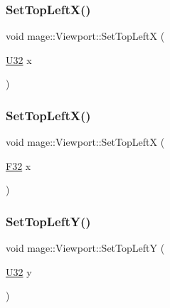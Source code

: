 \hypertarget{classmage_1_1_viewport_ade1d4a8ed0ecb51f7e70551f20cb4bea}{}\label{classmage_1_1_viewport_ade1d4a8ed0ecb51f7e70551f20cb4bea} 
\subsubsection{\texorpdfstring{Set\+Top\+Left\+X()}{SetTopLeftX()}\hspace{0.1cm}{\footnotesize\ttfamily [1/2]}}
{\footnotesize\ttfamily void mage\+::\+Viewport\+::\+Set\+Top\+LeftX (\begin{DoxyParamCaption}\item[{\hyperlink{namespacemage_a41c104c036fba3756a74e19f793eeaa1}{U32}}]{x }\end{DoxyParamCaption})\hspace{0.3cm}{\ttfamily [noexcept]}}

\hypertarget{classmage_1_1_viewport_a4626d58f3b62ed61318a090bf9522c9a}{}\label{classmage_1_1_viewport_a4626d58f3b62ed61318a090bf9522c9a} 
\subsubsection{\texorpdfstring{Set\+Top\+Left\+X()}{SetTopLeftX()}\hspace{0.1cm}{\footnotesize\ttfamily [2/2]}}
{\footnotesize\ttfamily void mage\+::\+Viewport\+::\+Set\+Top\+LeftX (\begin{DoxyParamCaption}\item[{\hyperlink{namespacemage_aa97e833b45f06d60a0a9c4fc22ae02c0}{F32}}]{x }\end{DoxyParamCaption})\hspace{0.3cm}{\ttfamily [noexcept]}}

\hypertarget{classmage_1_1_viewport_afb82849d9082a60372add783d89263e4}{}\label{classmage_1_1_viewport_afb82849d9082a60372add783d89263e4} 
\subsubsection{\texorpdfstring{Set\+Top\+Left\+Y()}{SetTopLeftY()}\hspace{0.1cm}{\footnotesize\ttfamily [1/2]}}
{\footnotesize\ttfamily void mage\+::\+Viewport\+::\+Set\+Top\+LeftY (\begin{DoxyParamCaption}\item[{\hyperlink{namespacemage_a41c104c036fba3756a74e19f793eeaa1}{U32}}]{y }\end{DoxyParamCaption})\hspace{0.3cm}{\ttfamily [noexcept]}}

